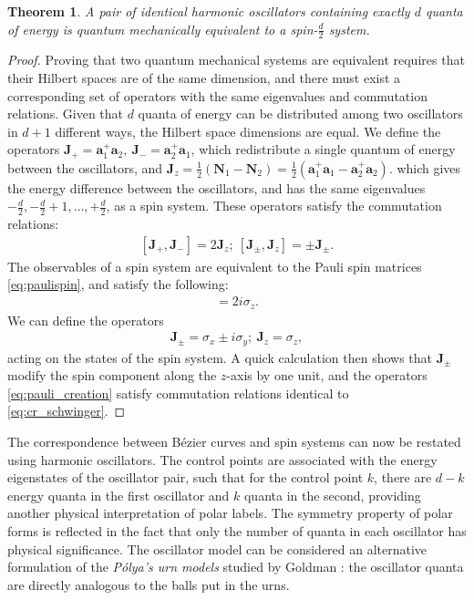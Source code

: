 \documentclass[final,3p,mathptmx]{elsarticle}
\newtheorem{theorem}{Theorem}
\begin{document}
\begin{theorem}
	A pair of identical harmonic oscillators containing exactly $d$ quanta of energy is quantum mechanically equivalent to a spin-$\frac{d}{2}$ system.
\end{theorem}
\begin{proof}
	Proving that two quantum mechanical systems are equivalent requires that their Hilbert spaces are of the same dimension, and there must exist a corresponding set of operators with the same eigenvalues and commutation relations.
	Given that $d$ quanta of energy can be distributed among two oscillators in $d+1$ different ways, the Hilbert space dimensions are equal. We define the operators $\mathbf{J}_{+} = \mathbf{a}_{1}^{+}\mathbf{a}_{2},\ \mathbf{J}_{-} = \mathbf{a}_{2}^{+}\mathbf{a}_{1}$, which redistribute a single quantum of energy between the oscillators, and $\mathbf{J}_{z} = \frac{1}{2}(\mathbf{N}_{1} - \mathbf{N}_{2}) =  \frac{1}{2}(\mathbf{a}_{1}^{+}\mathbf{a}_{1} - \mathbf{a}_{2}^{+}\mathbf{a}_{2})$. which gives the energy difference between the oscillators, and has the same eigenvalues $-\frac{d}{2}, -\frac{d}{2}+1, \ldots, +\frac{d}{2}$, as a spin system. These operators satisfy the commutation relations:
	\begin{align}\label{eq:cr_schwinger}
	[\mathbf{J}_{+},\mathbf{J}_{-}] = 2\mathbf{J}_{z};\ 
	[\mathbf{J}_{\pm},\mathbf{J}_{z} ] = \pm \mathbf{J}_{\pm}.
	\end{align} 
	The observables of a spin system are equivalent to the Pauli spin matrices \eqref{eq:paulispin}, and satisfy the following:
	\begin{align}
	[\sigma_{x}, \sigma_{y}] = 2i\sigma_{z}.
	\end{align}
	We can define the operators 
	\begin{align}\label{eq:pauli_creation}
	\mathbf{J}_{\pm} = \sigma_{x} \pm i \sigma_{y};\ \mathbf{J}_{z} = \sigma_{z},
	\end{align}
	acting on the states of the spin system. A quick calculation then shows that $\mathbf{J}_{\pm}$ modify the spin component along the $z$-axis by one unit, and the operators \eqref{eq:pauli_creation} satisfy commutation relations identical to \eqref{eq:cr_schwinger}.
\end{proof}

The correspondence between B\'{e}zier curves and spin systems can now be restated using harmonic oscillators. The control points are associated with the energy eigenstates of the oscillator pair, such that for the control point $k$, there are $d-k$ energy quanta in the first oscillator and $k$ quanta in the second, providing another physical interpretation of polar labels. The symmetry property of polar forms is reflected in the fact that only the number of quanta in each oscillator has physical significance. The oscillator model can be considered an alternative formulation of the \emph{P\'{o}lya's urn models} studied by Goldman \cite{goldman1985polya}: the oscillator quanta are directly analogous to the balls put in the urns.
\end{document}
